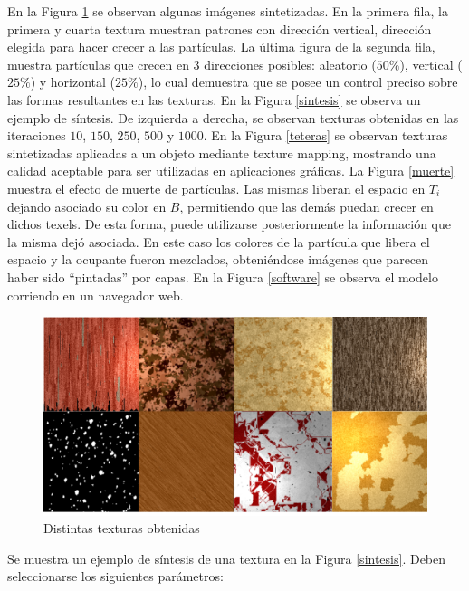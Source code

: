 \documentclass[spanish,a4paper,11pt,oneside,links]{report}
\begin{document}
En la Figura \ref{resultados} se observan algunas im\'agenes sintetizadas. En la primera fila, la primera y cuarta textura muestran patrones con direcci\'on vertical, direcci\'on elegida para hacer crecer a las part\'iculas. La \'ultima figura de la segunda fila, muestra part\'iculas que crecen en 3 direcciones posibles: aleatorio ($50\%$), vertical ($25\%$) y horizontal ($25\%$), lo cual demuestra que se posee un control preciso sobre las formas resultantes en las texturas. En la Figura \ref{sintesis} se observa un ejemplo de s\'intesis. De izquierda a derecha, se observan texturas obtenidas en las iteraciones $10$, $150$, $250$, $500$ y $1000$. En la Figura \ref{teteras} se observan texturas sintetizadas aplicadas a un objeto mediante texture mapping, mostrando una calidad aceptable para ser utilizadas en aplicaciones gr\'aficas. La Figura \ref{muerte} muestra el efecto de muerte de part\'iculas. Las mismas liberan el espacio en $T_{i}$ dejando asociado su color en $B$, permitiendo que las dem\'as puedan crecer en dichos texels. De esta forma, puede utilizarse posteriormente la informaci\'on que la misma dej\'o asociada. En este caso los colores de la part\'icula que libera el espacio y la ocupante fueron mezclados, obteni\'endose im\'agenes que parecen haber sido ``pintadas'' por capas. En la Figura \ref{software} se observa el modelo corriendo en un navegador web.


\begin{figure}[t!]
\centering
\includegraphics[scale=0.18]{resultados}
\caption{Distintas texturas obtenidas}
\label{resultados}
\end{figure}

Se muestra un ejemplo de s\'intesis de una textura en la Figura \ref{sintesis}. Deben seleccionarse los siguientes par\'ametros:
\end{document}
